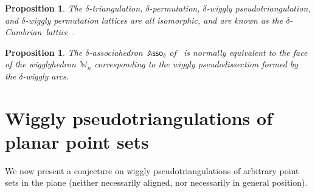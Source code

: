 \documentclass[submission]{FPSAC2025}
\newtheorem{proposition}[theorem]{Proposition}
\theoremstyle{definition}
\newcommand{\darkblue}{\color{darkblue}} %
\newcommand{\defn}[1]{\textsl{\darkblue #1}} %
\newcommand{\polytope}[1]{\mathds{#1}} %
\newcommand{\wigglyhedron}{\polytope{W}} %
\newcommand{\Asso}{\polytope{A}\mathsf{sso}} %
\begin{document}
\begin{proposition}
\label{prop:CambrianLattice}
The $\delta$-triangulation, $\delta$-permutation, \mbox{$\delta$-wiggly} pseudotriangulation, and $\delta$-wig\-gly permutation lattices are all isomorphic, and are known as the \defn{$\delta$-Cambrian~lattice}~\cite{Reading-CambrianLattices}.
\end{proposition}

\begin{proposition}
\label{prop:CambrianFan}
The $\delta$-associahedron~$\Asso_\delta$ of~\cite{HohlwegLange} is normally equivalent to the face of the wigglyhedron~$\wigglyhedron_n$ corresponding to the wiggly pseudodissection formed by the $\delta$-wiggly arcs.
\end{proposition}

\newpage
\section{Wiggly pseudotriangulations of planar point sets}
\label{sec:planarPointSets}

We now present a conjecture on wiggly pseudotriangulations of arbitrary point sets in the plane (neither necessarily aligned, nor necessarily in general position).
\end{document}

